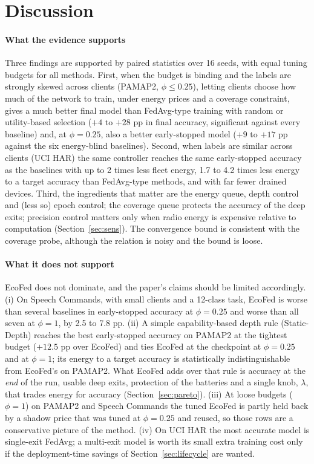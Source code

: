 \section{Discussion}\label{sec:discussion}

\paragraph{What the evidence supports}
Three findings are supported by paired statistics over 16 seeds, with equal tuning budgets for all methods. First, when the budget is binding and the labels are strongly skewed across clients (PAMAP2, $\phi\le0.25$), letting clients choose how much of the network to train, under energy prices and a coverage constraint, gives a much better final model than FedAvg-type training with random or utility-based selection ($+4$ to $+28$ pp in final accuracy, significant against every baseline) and, at $\phi=0.25$, also a better early-stopped model ($+9$ to $+17$ pp against the six energy-blind baselines). Second, when labels are similar across clients (UCI HAR) the same controller reaches the same early-stopped accuracy as the baselines with up to 2 times less fleet energy, 1.7 to 4.2 times less energy to a target accuracy than FedAvg-type methods, and with far fewer drained devices. Third, the ingredients that matter are the energy queue, depth control and (less so) epoch control; the coverage queue protects the accuracy of the deep exits; precision control matters only when radio energy is expensive relative to computation (Section~\ref{sec:sens}). The convergence bound is consistent with the coverage probe, although the relation is noisy and the bound is loose.

\paragraph{What it does not support}
EcoFed does not dominate, and the paper's claims should be limited accordingly. (i) On Speech Commands, with small clients and a 12-class task, EcoFed is worse than several baselines in early-stopped accuracy at $\phi=0.25$ and worse than all seven at $\phi=1$, by 2.5 to 7.8 pp. (ii) A simple capability-based depth rule (Static-Depth) reaches the best early-stopped accuracy on PAMAP2 at the tightest budget ($+12.5$ pp over EcoFed) and ties EcoFed at the checkpoint at $\phi=0.25$ and at $\phi=1$; its energy to a target accuracy is statistically indistinguishable from EcoFed's on PAMAP2. What EcoFed adds over that rule is accuracy at the \emph{end} of the run, usable deep exits, protection of the batteries and a single knob, $\lambda$, that trades energy for accuracy (Section~\ref{sec:pareto}). (iii) At loose budgets ($\phi=1$) on PAMAP2 and Speech Commands the tuned EcoFed is partly held back by a shadow price that was tuned at $\phi=0.25$ and reused, so those rows are a conservative picture of the method. (iv) On UCI HAR the most accurate model is single-exit FedAvg; a multi-exit model is worth its small extra training cost only if the deployment-time savings of Section~\ref{sec:lifecycle} are wanted.

